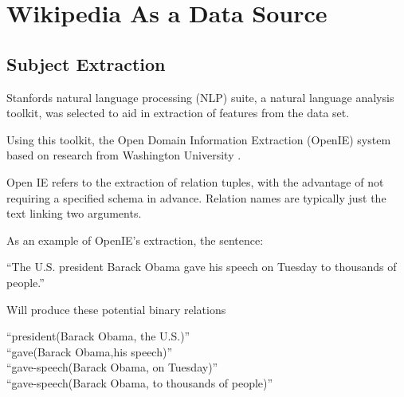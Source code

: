 \documentclass[12pt]{report}
\begin{document}


\chapter{Wikipedia As a Data Source}

        \section{Subject Extraction}
        Stanfords natural language processing (NLP) suite,
        a natural language analysis toolkit,
        was selected to aid in extraction of features from the data set.

        Using this toolkit, the Open Domain Information Extraction (OpenIE) system
        based on research from Washington University \cite{angeli2015leveraging}.

        Open IE refers to the extraction of relation tuples, with the advantage of not requiring a
        specified schema in advance. Relation names are typically just the text linking two arguments.

        As an example of OpenIE's extraction, the sentence:\\
        \begin{center}
        ``The U.S. president Barack Obama gave his speech on Tuesday to thousands of people.''\\
        \end{center}
        Will produce these potential binary relations
        \begin{center}
        ``president(Barack Obama, the U.S.)''\\
        ``gave(Barack Obama,his speech)''\\
        ``gave-speech(Barack Obama, on Tuesday)''\\
        ``gave-speech(Barack Obama, to thousands of people)''\\
        \end{center}
\end{document}
